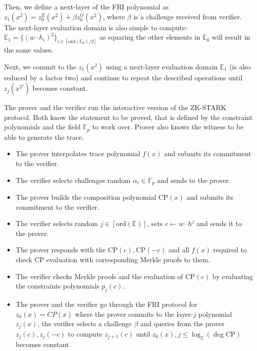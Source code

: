 \documentclass[../lecture-notes-148x210.tex]{subfiles}
\begin{document}
Then, we define a next-layer of the FRI polynomial as $z_1(x^2) = z_0^E(x^2) +
\beta z_0^O(x^2)$, where $\beta$ is a challenge received from verifier. The
next-layer evaluation domain is also simple to compute: $\mathbb{E}_1 =
\{(w\cdot h_i)^2\}_{i \in [\text{ord}(\mathbb{E}_0)/2]}$ as squaring the
other elements in $\mathbb{E}_0$ will result in the same values.

Next, we commit to the $z_1(x^2)$ using a next-layer evaluation domain
$\mathbb{E}_1$ (is also reduced by a factor two) and continue to repeat the
described operations until $z_j(x^{2^j})$ becomes constant.

\begin{tcolorbox}[title=Interactive ZK-STARK protocol,
    colback=blue!5!white,
    colframe=blue!75!black,
    colbacktitle=blue!25!white,
    coltitle=blue!20!black,
    fonttitle=\bfseries,
    boxrule=1.25pt,
    subtitle style={boxrule=0pt,
    colback=blue!20!white,
    colupper=blue!75!gray} ]
    \small

    The prover and the verifier run the interactive version of the ZK-STARK
    protocol. Both know the statement to be proved, that is defined by the
    constraint polynomials and the field $\mathbb{F}_p$ to work over. Prover also
    knows the witness to be able to generate the trace.

    \begin{itemize}[label=]
        \item The prover interpolates trace polynomial $f(x)$ and submits its
        commitment to the verifier.
        \item The verifier selects challenges random $\alpha_i \in \mathbb{F}_p$ 
        and sends to the prover.
        \item The prover builds the composition polynomial $\text{CP}(x)$ and
        submits its commitment to the verifier.
    \end{itemize}

    \begin{itemize}[label=]
        \item The verifier selects random $j \in [\text{ord}(\mathbb{E})]$, sets
        $c \gets w\cdot h^j$ and sends it to the prover.
        \item The prover responds with the $\text{CP}(c), \text{CP}(-c)$ and all
        $f(x)$ required to check $\text{CP}$ evaluation with corresponding Merkle
        proofs to them.
        \item The verifier checks Merkle proofs and the evaluation of
        $\text{CP}(c)$ by evaluating the constraints polynomials $p_j(c)$.
        \item The prover and the verifier go through the FRI protocol for
        $z_0(x) = CP(x)$ where the prover commits to the layer-$j$ polynomial
        $z_j(x)$, the verifier selects a challenge $\beta$ and queries from the
        prover $z_j(c), z_j(-c)$ to compute $z_{j+1}(c)$ until $z_k(x), j \leq
        \log_2(\deg \text{CP})$ becomes constant.
    \end{itemize}
    
\end{tcolorbox}
\end{document}
